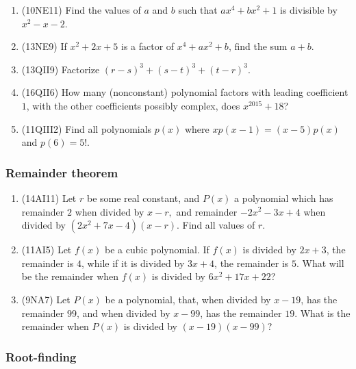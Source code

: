 \documentclass[10pt,paper=letter]{scrartcl}
\begin{document}
\begin{enumerate}

\item (10NE11) Find the values of $a$ and $b$ such that $ax^4 + bx^2 + 1$ is divisible by $x^2 - x - 2$.

\item (13NE9) If $x^2 + 2x + 5$ is a factor of $x^4 + ax^2 + b$, find the sum $a + b$.

\item (13QII9) Factorize $(r-s)^3 + (s-t)^3 + (t-r)^3$.

\item (16QII6) How many (nonconstant) polynomial factors with leading coefficient $1$, with the other coefficients possibly complex, does $x^{2015} + 18$?

\item (11QIII2) Find all polynomials $p(x)$ where $xp(x-1)=(x-5)p(x)$ and $p(6) = 5!$.

\end{enumerate}

\subsubsection*{Remainder theorem}

\begin{enumerate}

\item (14AI11) Let $r$ be some real constant, and $P(x)$ a polynomial which has remainder $2$ when divided by $x-r,$ and remainder $-2x^2-3x+4$ when divided by $(2x^2+7x-4)(x-r)$. Find all values of $r$.

\item (11AI5) Let $f(x)$ be a cubic polynomial. If $f(x)$ is divided by $2x+3$, the remainder is $4$, while if it is divided by $3x+4$, the remainder is $5$. What will be the remainder when $f(x)$ is divided by $6x^2 + 17x + 22$?

\item (9NA7) Let $P(x)$ be a polynomial, that, when divided by $x - 19$, has the remainder $99$, and when divided by $x - 99$, has the remainder $19$. What is the remainder when $P(x)$ is divided by $(x - 19)(x- 99)$?

\end{enumerate}

\subsubsection*{Root-finding}
\end{document}
